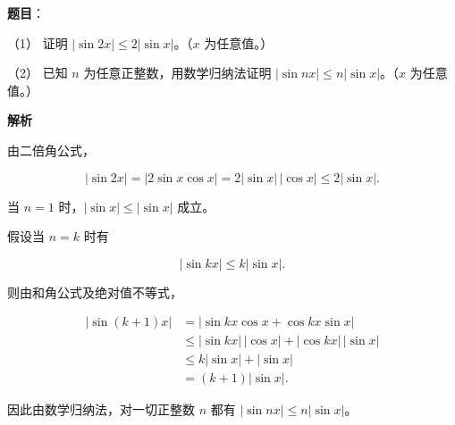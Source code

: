\begin{answer}

\textbf{题目}：

（1） 证明 $|\sin2x|\leqslant2|\sin x|$。（$x$ 为任意值。）

（2） 已知 $n$ 为任意正整数，用数学归纳法证明 $|\sin nx|\leqslant n|\sin x|$。（$x$ 为任意值。）

\textbf{解析}


由二倍角公式，

\nopagebreak[4]
\[|\sin2x|=|2\sin x\cos x|=2|\sin x|\,|\cos x|\leqslant2|\sin x|.\]


当 $n=1$ 时，$|\sin x|\leqslant|\sin x|$ 成立。

假设当 $n=k$ 时有

\nopagebreak[4]
\[|\sin kx|\leqslant k|\sin x|.\]

则由和角公式及绝对值不等式，

\nopagebreak[4]
\[\begin{aligned}
|\sin(k+1)x|
&=|\sin kx\cos x+\cos kx\sin x|\\
&\leqslant|\sin kx|\,|\cos x|+|\cos kx|\,|\sin x|\\
&\leqslant k|\sin x|+|\sin x|\\
&=(k+1)|\sin x|.
\end{aligned}\]

因此由数学归纳法，对一切正整数 $n$ 都有 $|\sin nx|\leqslant n|\sin x|$。



\end{answer}
